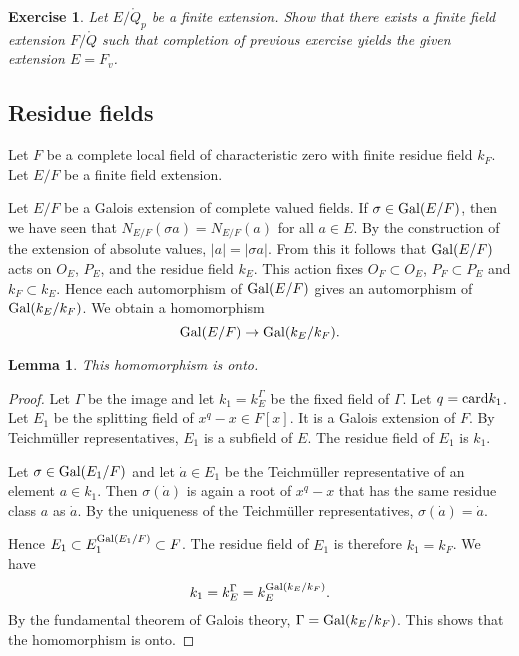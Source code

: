 \documentclass{amsart}
\newtheorem{lemma}[equation]{Lemma}
\newtheorem{exercise}{Exercise}
\def\abs#1{{|#1|}}
\begin{document}

\begin{exercise}  Let $E/\ring{Q}_p$ be a finite extension.  Show that there
exists a finite field extension $F/\ring{Q}$ such that completion of previous
exercise yields the given extension $E=F_v$.
\end{exercise}

\subsection{Residue fields}

Let $F$ be a complete local field of characteristic zero with finite residue field $k_F$.
Let $E/F$ be a finite field extension.

Let $E/F$ be a Galois extension of complete valued fields.
If $\sigma\in{\operatorname{Gal}}(E/F)$, then we have seen that $N_{E/F}(\sigma a) = N_{E/F}(a)$
for all $a\in E$.  By the construction of the extension of absolute values,
$\abs{a}=\abs{\sigma{a}}$.  From this it follows that ${\operatorname{Gal}}(E/F)$
acts on $O_E$, $P_E$, and the residue field $k_E$.
This action fixes $O_F\subset O_E$, $P_F\subset P_E$ and $k_F\subset k_E$.
Hence each automorphism of ${\operatorname{Gal}}(E/F)$ gives an automorphism of 
${\operatorname{Gal}}(k_E/k_F)$.  We obtain a homomorphism
\[
{\operatorname{Gal}}(E/F)\to {\operatorname{Gal}}(k_E/k_F).
\]

\begin{lemma} This homomorphism is onto.
\end{lemma}

\begin{proof} Let $\Gamma$ be the image and let $k_1 = k_E^\Gamma$ be the fixed
field of $\Gamma$.  Let $q={\operatorname{card}}{k_1}$.  Let $E_1$ be the splitting field
of $x^q-x\in F[x]$.  It is a Galois extension of $F$.
By Teichm\"uller representatives, $E_1$ is a subfield
of $E$.  The residue field of $E_1$ is $k_1$.

Let $\sigma\in {\operatorname{Gal}}(E_1/F)$ and let $\dot a\in E_1$ be 
the Teichm\"uller representative of an element $a\in k_1$.
Then $\sigma (\dot a)$ is again a root of $x^q-x$ that has the
same residue class $a$ as $\dot a$.  By the uniqueness of the Teichm\"uller
representatives, $\sigma(\dot a) = \dot a$.  

Hence $E_1\subset E_1^{{\operatorname{Gal}}(E_1/F)} \subset F$.  The residue field of 
$E_1$ is therefore $k_1 = k_F$.  We have
\[
k_1 = k_E^\Gamma = k_E^{{\operatorname{Gal}}(k_E/k_F)}.
\]
By the fundamental theorem of Galois theory, $\Gamma={\operatorname{Gal}}(k_E/k_F)$.
This shows that the homomorphism is onto.
\end{proof}
\end{document}
